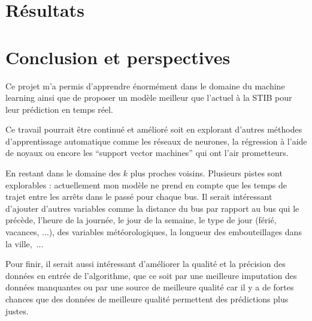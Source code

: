\documentclass[letterpaper]{article}
\begin{document}
\section{Résultats}



\section{Conclusion et perspectives}

Ce projet m'a permis d'apprendre énormément dans le domaine du machine learning ainsi que de proposer un modèle meilleur que l'actuel à la STIB pour leur prédiction en temps réel.

Ce travail pourrait être continué et amélioré soit en explorant d'autres méthodes d'apprentissage automatique comme les réseaux de neurones, la régression à l'aide de noyaux ou encore les ``support vector machines'' qui ont l'air prometteurs.

En restant dans le domaine des $k$ plus proches voisins. Plusieurs pistes sont explorables :
actuellement mon modèle ne prend en compte que les temps de trajet entre les arrêts dans le passé pour chaque bus.
Il serait intéressant d'ajouter d'autres variables comme la distance du bus par rapport au bus qui le précède, l'heure de la journée, le jour de la semaine, le type de jour (férié, vacances, ...), des variables météorologiques, la longueur des embouteillages dans la ville,~...

Pour finir, il serait aussi intéressant d'améliorer la qualité et la précision des données en entrée de l'algorithme, que ce soit par une meilleure imputation des données manquantes ou par une source de meilleure qualité car il y a de fortes chances que des données de meilleure qualité permettent des prédictions plus justes.

\footnotesize


\end{document}
